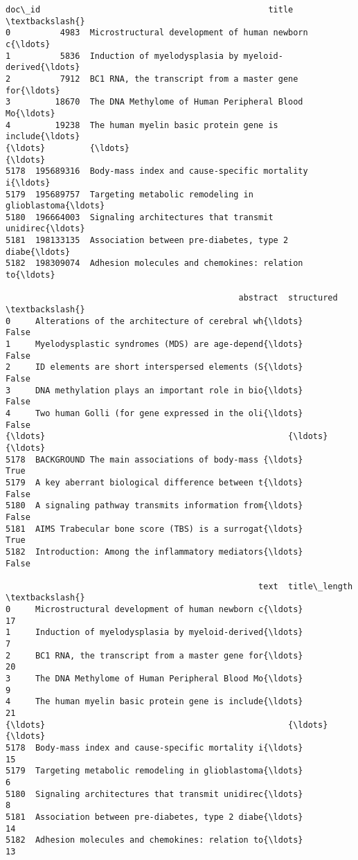 \documentclass[11pt]{article}
\makeatletter
\newcommand{\boxspacing}{\kern\kvtcb@left@rule\kern\kvtcb@boxsep}
\newcommand{\prompt}[4]{
        {\ttfamily\llap{{\color{#2}[#3]:\hspace{3pt}#4}}\vspace{-\baselineskip}}
    }
\makeatother
\begin{document}
            \begin{tcolorbox}[breakable, size=fbox, boxrule=.5pt, pad at break*=1mm, opacityfill=0]
\prompt{Out}{outcolor}{24}{\boxspacing}
\begin{Verbatim}[commandchars=\\\{\}]
         doc\_id                                              title  \textbackslash{}
0          4983  Microstructural development of human newborn c{\ldots}
1          5836  Induction of myelodysplasia by myeloid-derived{\ldots}
2          7912  BC1 RNA, the transcript from a master gene for{\ldots}
3         18670  The DNA Methylome of Human Peripheral Blood Mo{\ldots}
4         19238  The human myelin basic protein gene is include{\ldots}
{\ldots}         {\ldots}                                                {\ldots}
5178  195689316  Body-mass index and cause-specific mortality i{\ldots}
5179  195689757  Targeting metabolic remodeling in glioblastoma{\ldots}
5180  196664003  Signaling architectures that transmit unidirec{\ldots}
5181  198133135  Association between pre-diabetes, type 2 diabe{\ldots}
5182  198309074  Adhesion molecules and chemokines: relation to{\ldots}

                                               abstract  structured  \textbackslash{}
0     Alterations of the architecture of cerebral wh{\ldots}       False
1     Myelodysplastic syndromes (MDS) are age-depend{\ldots}       False
2     ID elements are short interspersed elements (S{\ldots}       False
3     DNA methylation plays an important role in bio{\ldots}       False
4     Two human Golli (for gene expressed in the oli{\ldots}       False
{\ldots}                                                 {\ldots}         {\ldots}
5178  BACKGROUND The main associations of body-mass {\ldots}        True
5179  A key aberrant biological difference between t{\ldots}       False
5180  A signaling pathway transmits information from{\ldots}       False
5181  AIMS Trabecular bone score (TBS) is a surrogat{\ldots}        True
5182  Introduction: Among the inflammatory mediators{\ldots}       False

                                                   text  title\_length  \textbackslash{}
0     Microstructural development of human newborn c{\ldots}            17
1     Induction of myelodysplasia by myeloid-derived{\ldots}             7
2     BC1 RNA, the transcript from a master gene for{\ldots}            20
3     The DNA Methylome of Human Peripheral Blood Mo{\ldots}             9
4     The human myelin basic protein gene is include{\ldots}            21
{\ldots}                                                 {\ldots}           {\ldots}
5178  Body-mass index and cause-specific mortality i{\ldots}            15
5179  Targeting metabolic remodeling in glioblastoma{\ldots}             6
5180  Signaling architectures that transmit unidirec{\ldots}             8
5181  Association between pre-diabetes, type 2 diabe{\ldots}            14
5182  Adhesion molecules and chemokines: relation to{\ldots}            13


\end{Verbatim}
\end{tcolorbox}
\end{document}
